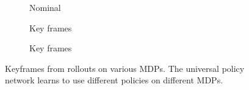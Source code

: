 \documentclass{article}
\begin{document}
\newpage
\begin{figure}[t!]
\begin{centering}
\begin{subfigure}[b]{0.3\columnwidth}
\caption{Nominal}
\end{subfigure}
\begin{subfigure}[b]{0.3\columnwidth}
\caption{Key frames}
\end{subfigure}
\begin{subfigure}[b]{0.3\columnwidth}
\caption{Key frames}
\end{subfigure}
\end{centering}
\caption{Keyframes from rollouts on various MDPs. The universal policy network learns to use different policies on different MDPs.}
\end{figure}
\end{document}
